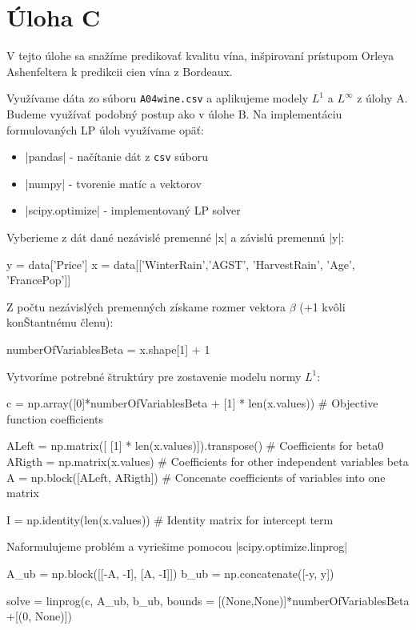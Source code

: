 \documentclass[report.tex]{subfiles}
\begin{document}
   

\section{Úloha C}
V tejto úlohe sa snažíme predikovať kvalitu vína, inšpirovaní prístupom Orleya Ashenfeltera k predikcii cien vína z Bordeaux.

Využívame dáta zo súboru \verb|A04wine.csv| a aplikujeme modely $L^1$ a $L^{\infty}$ z úlohy A. Budeme využívať podobný postup ako v úlohe B. Na implementáciu formulovaných LP úloh využívame opäť:
\begin{itemize}
	\item \pyth|pandas| - načítanie dát z \verb|csv| súboru
	\item \pyth|numpy| - tvorenie matíc a vektorov
	\item \pyth|scipy.optimize| - implementovaný LP solver
\end{itemize}

Vyberieme z dát dané nezávislé premenné \pyth|x| a závislú premennú \pyth|y|:

\begin{python}
y = data['Price']
x = data[['WinterRain','AGST', 'HarvestRain', 'Age', 'FrancePop']]
\end{python}

Z počtu nezávislých premenných získame rozmer vektora $\beta$ (+1 kvôli konŠtantnému členu):

\begin{python}
numberOfVariablesBeta = x.shape[1] + 1
\end{python}

Vytvoríme potrebné štruktúry pre zostavenie modelu normy $L^1$:

\begin{python}
c = np.array([0]*numberOfVariablesBeta + [1] * len(x.values)) # Objective function coefficients

ALeft = np.matrix([ [1] * len(x.values)]).transpose() # Coefficients for beta0
ARigth = np.matrix(x.values) # Coefficients for other independent variables beta
A = np.block([ALeft, ARigth]) # Concenate coefficients of variables into one matrix

I = np.identity(len(x.values)) # Identity matrix for intercept term
\end{python}

Naformulujeme problém a vyriešime pomocou \pyth|scipy.optimize.linprog|

\begin{python}
A_ub = np.block([[-A, -I], [A, -I]])
b_ub = np.concatenate([-y, y])

solve = linprog(c, A_ub, b_ub, bounds = [(None,None)]*numberOfVariablesBeta +[(0, None)])
\end{python}
\end{document}
